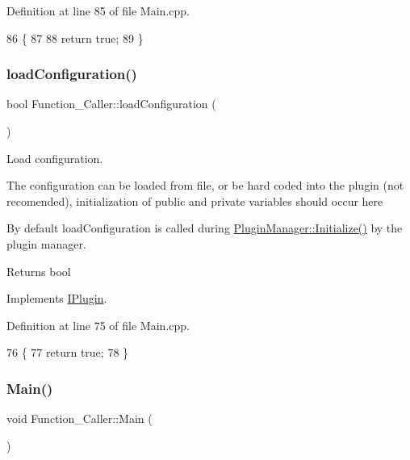 Definition at line 85 of file Main.\+cpp.


\begin{DoxyCode}
86 \{
87 
88     \textcolor{keywordflow}{return} \textcolor{keyword}{true};
89 \}
\end{DoxyCode}
\mbox{\label{class_function___caller_a6ce3a356b5eb30c51d39f2ce0ecb9128}} 
\subsubsection{\texorpdfstring{load\+Configuration()}{loadConfiguration()}}
{\footnotesize\ttfamily bool Function\+\_\+\+Caller\+::load\+Configuration (\begin{DoxyParamCaption}{ }\end{DoxyParamCaption})\hspace{0.3cm}{\ttfamily [virtual]}}



Load configuration. 

The configuration can be loaded from file, or be hard coded into the plugin (not recomended), initialization of public and private variables should occur here

By default load\+Configuration is called during \hyperlink{class_plugin_manager_a956e653b7db36da9d034b4a93c8308d5}{Plugin\+Manager\+::\+Initialize()} by the plugin manager.

\begin{DoxyReturn}{Returns}
bool 
\end{DoxyReturn}


Implements \hyperlink{class_i_plugin_a418cff309436d3a15d9a4ce7369db6dd}{I\+Plugin}.



Definition at line 75 of file Main.\+cpp.


\begin{DoxyCode}
76 \{
77     \textcolor{keywordflow}{return} \textcolor{keyword}{true};
78 \}
\end{DoxyCode}
\mbox{\label{class_function___caller_a4c39451baadbdc89f6f7e212638cb811}} 
\subsubsection{\texorpdfstring{Main()}{Main()}}
{\footnotesize\ttfamily void Function\+\_\+\+Caller\+::\+Main (\begin{DoxyParamCaption}{ }\end{DoxyParamCaption})\hspace{0.3cm}{\ttfamily [virtual]}}



